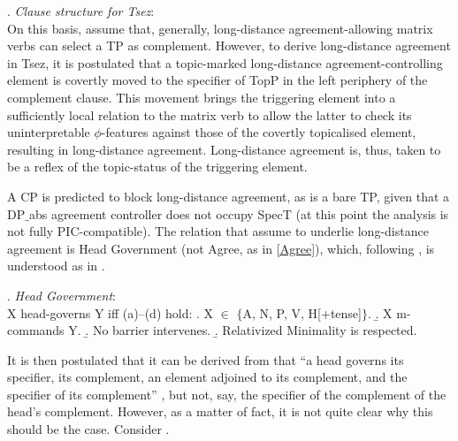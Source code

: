 \documentclass[output=paper
,modfonts
,nonflat]{langsci/langscibook}
\begin{document}
\Lsciexi. {\it Clause \label{Tsezstructure}structure for Tsez}:\\

On this  basis,  \cite{Polinsky&Potsdam:01} assume that, generally, long-distance agreement-allowing matrix
  verbs can select a TP as complement. 
However,  to derive long-distance agreement in Tsez, it is postulated
that a   topic-marked long-distance agreement-controlling element is covertly moved to the
  specifier of TopP in the left periphery of the complement clause. 
 This movement brings the triggering element into a sufficiently
  local relation to the matrix verb to allow the latter to check its
  uninterpretable $\phi$-features against those of the covertly
  topicalised element, resulting in long-distance agreement.
 Long-distance agreement is, thus, taken to be a reflex of the topic-status of the
  triggering element. 

 A CP is predicted to block long-distance agreement, as is a bare TP,
 given that a DP$\_${abs} agreement controller does not occupy SpecT (at
 this point the analysis is not fully PIC-compatible). The relation
 that \cite{Polinsky&Potsdam:01} assume to underlie long-distance
 agreement is  Head Government (not Agree, as in \ref{Agree}),
 which, following \cite{Rizzi:90}, is understood as in \Next.

\Lsciex. {\it Head Government}:\\
X head-governs Y iff (a)--(d) hold:
\a. \label{list1}X $\in$ $\{$A, N, P, V, H[+{\rm tense}]$\}$.
\b. X m-commands Y.
\b. No barrier intervenes.
\b. Relativized Minimality is respected. 

It is then postulated that it can be derived from \Last that ``a head
governs its specifier, its complement, an element adjoined to its
complement, and the specifier of its complement''
\citep[627]{Polinsky&Potsdam:01}, but not, say, the specifier of
the complement of the head's complement. However, as a matter of fact,
  it is not quite clear why this should be the case. Consider \Next.
\end{document}
